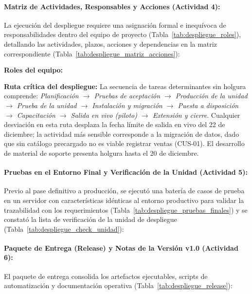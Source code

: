 \documentclass[12pt,a4paper]{article}
\begin{document}
\paragraph{Matriz de Actividades, Responsables y Acciones (Actividad 4):}
La ejecución del despliegue requiere una asignación formal e inequívoca de responsabilidades dentro del equipo de proyecto (Tabla~\ref{tab:despliegue_roles}), detallando las actividades, plazos, acciones y dependencias en la matriz correspondiente (Tabla~\ref{tab:despliegue_matriz_acciones}):

\textbf{Roles del equipo:}



\textbf{Ruta crítica del despliegue:} La secuencia de tareas determinantes sin holgura comprende: \emph{Planificación $\rightarrow$ Pruebas de aceptación $\rightarrow$ Producción de la unidad $\rightarrow$ Prueba de la unidad $\rightarrow$ Instalación y migración $\rightarrow$ Puesta a disposición $\rightarrow$ Capacitación $\rightarrow$ Salida en vivo (piloto) $\rightarrow$ Extensión y cierre}. Cualquier desviación en esta ruta desplaza la fecha límite de salida en vivo del 22 de diciembre; la actividad más sensible corresponde a la migración de datos, dado que sin catálogo precargado no es viable registrar ventas (CUS-01). El desarrollo de material de soporte presenta holgura hasta el 20 de diciembre.

\paragraph{Pruebas en el Entorno Final y Verificación de la Unidad (Actividad 5):}
Previo al pase definitivo a producción, se ejecutó una batería de casos de prueba en un servidor con características idénticas al entorno productivo para validar la trazabilidad con los requerimientos (Tabla~\ref{tab:despliegue_pruebas_finales}) y se constató la lista de verificación de la unidad de despliegue (Tabla~\ref{tab:despliegue_check_unidad}):



\paragraph{Paquete de Entrega (Release) y Notas de la Versión v1.0 (Actividad 6):}
El paquete de entrega consolida los artefactos ejecutables, scripts de automatización y documentación operativa (Tabla~\ref{tab:despliegue_release}):
\end{document}
